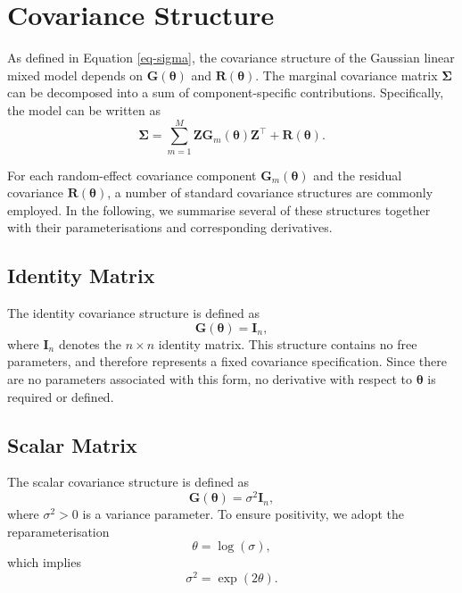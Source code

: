 \documentclass[
  letterpaper,
  DIV=11,
  numbers=noendperiod]{scrartcl}
\begin{document}
\section{Covariance Structure}\label{covariance-structure}

As defined in Equation \eqref{eq-sigma}, the covariance structure of the
Gaussian linear mixed model depends on \(\symbf{G}(\symbf{\theta})\) and
\(\symbf{R}(\symbf{\theta})\). The marginal covariance matrix
\(\symbf{\Sigma}\) can be decomposed into a sum of component-specific
contributions. Specifically, the model can be written as
\begin{equation}
\symbf{\Sigma} = \sum_{m=1}^{M} \symbf{Z}\symbf{G}_m(\symbf{\theta})\symbf{Z}^\top + \symbf{R}(\symbf{\theta}).
\end{equation}

For each random-effect covariance component
\(\symbf{G}_m(\symbf{\theta})\) and the residual covariance
\(\symbf{R}(\symbf{\theta})\), a number of standard covariance
structures are commonly employed. In the following, we summarise several
of these structures together with their parameterisations and
corresponding derivatives.

\subsection{Identity Matrix}\label{identity-matrix}

The identity covariance structure is defined as \begin{equation}
\symbf{G}(\symbf{\theta}) = \symbf{I}_n,
\end{equation} where \(\symbf{I}_n\) denotes the \(n \times n\) identity
matrix. This structure contains no free parameters, and therefore
represents a fixed covariance specification. Since there are no
parameters associated with this form, no derivative with respect to
\(\symbf{\theta}\) is required or defined.

\subsection{Scalar Matrix}\label{scalar-matrix}

The scalar covariance structure is defined as \begin{equation}
\symbf{G}(\symbf{\theta}) = \sigma^2 \symbf{I}_n,
\end{equation} where \(\sigma^2 > 0\) is a variance parameter. To ensure
positivity, we adopt the reparameterisation \begin{equation}
\theta = \log(\sigma),
\end{equation} which implies \begin{equation}
\sigma^2 = \exp(2\theta).
\end{equation}
\end{document}
